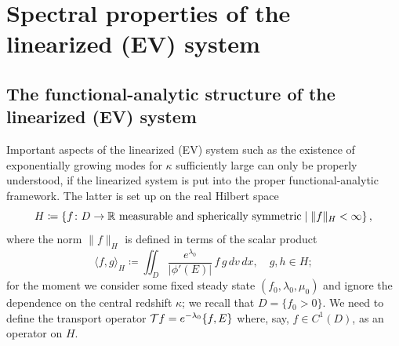 \documentclass[11pt]{article}
\begin{document}
\section{Spectral properties of the linearized (EV) system}
\label{FA}
\setcounter{equation}{0}
%
%
\subsection{The functional-analytic structure of the linearized (EV) system}
%
%
Important aspects of the linearized (EV) system such as the existence
of exponentially growing modes for $\kappa$ sufficiently large
can only be properly understood, if the linearized system is put into
the proper functional-analytic framework. The latter is set up on
the real Hilbert space
\[ 
H \coloneqq \left\{f\colon D \to \mathbb R
\text{ measurable and spherically symmetric}
\mid \|f\|_H < \infty \right\},  
\]
where the norm $\|f\|_H$ is defined in terms of the scalar product
\[ 
\langle f,g\rangle_{H} \coloneqq
\iint_{D} \frac{e^{\lambda_0}}{|\phi'(E)|}\,f\, g \, dv\, dx, \quad g,h\in H;
\]
for the moment we consider some fixed steady state $(f_0,\lambda_0,\mu_0)$
and ignore the dependence on the central redshift $\kappa$;
we recall that $D = \{f_0>0\}$.
We need to define the transport operator
${\cal T} f = e^{-\lambda_0}\{f,E\}$ where, say, $f\in C^1(D)$, as an operator on $H$.
\end{document}
